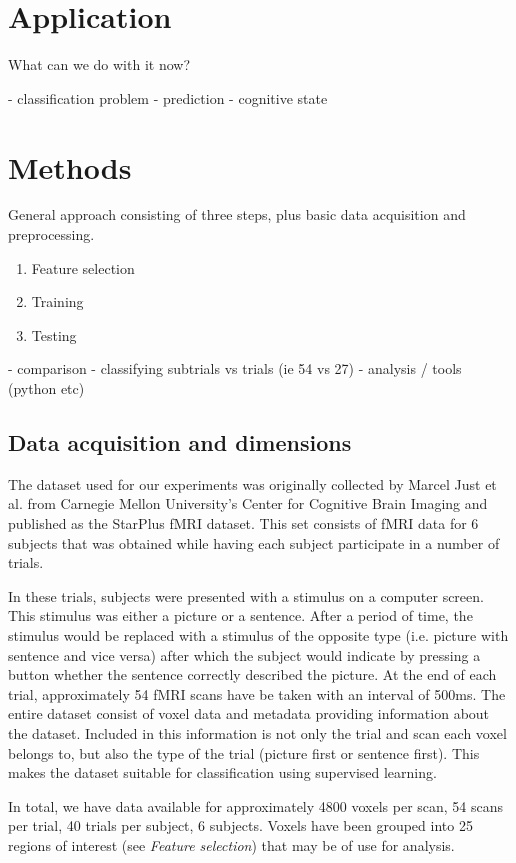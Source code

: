 \documentclass[preprint,journal]{vgtc}
\begin{document}
\section{Application}
\label{sec:application}


What can we do with it now?

- classification problem
- prediction
- cognitive state
\section{Methods}
\label{sec:methods}
General approach consisting of three steps, plus basic data acquisition and preprocessing.
\begin{enumerate}
  \item Feature selection
  \item Training
  \item Testing
\end{enumerate}



- comparison
- classifying subtrials vs trials (ie 54 vs 27)
- analysis / tools (python etc)

\subsection{Data acquisition and dimensions}
The dataset used for our experiments was originally collected by Marcel Just et al. from Carnegie Mellon University's Center for Cognitive Brain Imaging and published as the StarPlus fMRI dataset. This set consists of fMRI data for 6 subjects that was obtained while having each subject participate in a number of trials.

In these trials, subjects were presented with a stimulus on a computer screen. This stimulus was either a picture or a sentence. After a period of time, the stimulus would be replaced with a stimulus of the opposite type (i.e. picture with sentence and vice versa) after which the subject would indicate by pressing a button whether the sentence correctly described the picture. At the end of each trial, approximately 54 fMRI scans have be taken with an interval of 500ms.
The entire dataset consist of voxel data and metadata providing information about the dataset. Included in this information is not only the trial and scan each voxel belongs to, but also the type of the trial (picture first or sentence first). This makes the dataset suitable for classification using supervised learning.

In total, we have data available for approximately 4800 voxels per scan, 54 scans per trial, 40 trials per subject, 6 subjects. Voxels have been grouped into 25 regions of interest (see \textit{Feature selection}) that may be of use for analysis.
\end{document}

